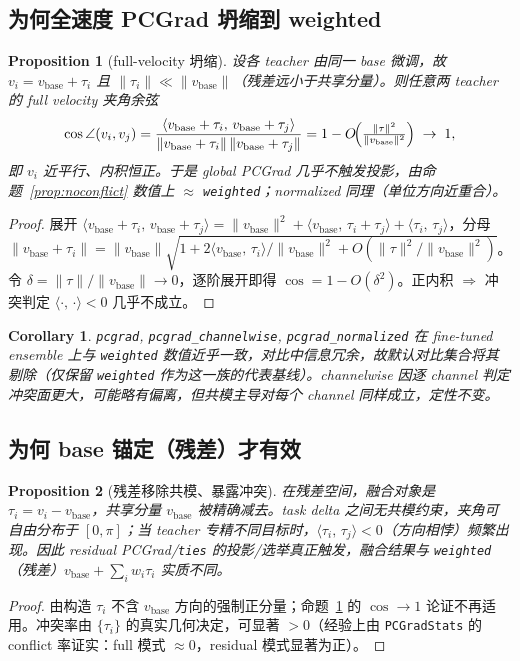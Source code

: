 \documentclass[11pt,a4paper]{article}
\newcommand{\vb}{v_{\mathrm{base}}}
\newcommand{\inner}[2]{\langle #1,\, #2\rangle}
\newcommand{\norm}[1]{\lVert #1\rVert}
\theoremstyle{plain}
\newtheorem{proposition}{Proposition}
\newtheorem{corollary}{Corollary}
\theoremstyle{definition}
\begin{document}
\subsection{为何全速度 PCGrad 坍缩到 weighted}

\begin{proposition}[full-velocity 坍缩]
\label{prop:collapse}
设各 teacher 由同一 base 微调，故 $v_i=\vb+\tau_i$ 且 $\norm{\tau_i}\ll\norm{\vb}$（残差远小于共享分量）。则任意两 teacher 的 full velocity 夹角余弦
\begin{equation}
\cos\angle(v_i,v_j)
=\frac{\inner{\vb+\tau_i}{\vb+\tau_j}}{\norm{\vb+\tau_i}\,\norm{\vb+\tau_j}}
= 1 - O\!\Bigl(\tfrac{\norm{\tau}^2}{\norm{\vb}^2}\Bigr)\;\to\;1,
\label{eq:collapse}
\end{equation}
即 $v_i$ 近平行、内积恒正。于是 global PCGrad 几乎不触发投影，由命题~\ref{prop:noconflict} 数值上 $\approx$ \texttt{weighted}；normalized 同理（单位方向近重合）。
\end{proposition}
\begin{proof}
展开 $\inner{\vb+\tau_i}{\vb+\tau_j}=\norm{\vb}^2+\inner{\vb}{\tau_i+\tau_j}+\inner{\tau_i}{\tau_j}$，分母 $\norm{\vb+\tau_i}=\norm{\vb}\sqrt{1+2\inner{\vb}{\tau_i}/\norm{\vb}^2+O(\norm{\tau}^2/\norm{\vb}^2)}$。令 $\delta=\norm{\tau}/\norm{\vb}\to0$，逐阶展开即得 $\cos=1-O(\delta^2)$。正内积 $\Rightarrow$ 冲突判定 $\inner{\cdot}{\cdot}<0$ 几乎不成立。
\end{proof}

\begin{corollary}
\label{cor:exclude}
\texttt{pcgrad}, \texttt{pcgrad\_channelwise}, \texttt{pcgrad\_normalized} 在 fine-tuned ensemble 上与 \texttt{weighted} 数值近乎一致，对比中信息冗余，故默认对比集合将其剔除（仅保留 \texttt{weighted} 作为这一族的代表基线）。channelwise 因逐 channel 判定冲突面更大，可能略有偏离，但共模主导对每个 channel 同样成立，定性不变。
\end{corollary}

\subsection{为何 base 锚定（残差）才有效}

\begin{proposition}[残差移除共模、暴露冲突]
\label{prop:residual}
在残差空间，融合对象是 $\tau_i=v_i-\vb$，共享分量 $\vb$ 被精确减去。task delta 之间无共模约束，夹角可自由分布于 $[0,\pi]$；当 teacher 专精不同目标时，$\inner{\tau_i}{\tau_j}<0$（方向相悖）频繁出现。因此 residual PCGrad/\texttt{ties} 的投影/选举\emph{真正触发}，融合结果与 \texttt{weighted}（残差）$\vb+\sum_i w_i\tau_i$ 实质不同。
\end{proposition}
\begin{proof}
由构造 $\tau_i$ 不含 $\vb$ 方向的强制正分量；命题~\ref{prop:collapse} 的 $\cos\to1$ 论证不再适用。冲突率由 $\{\tau_i\}$ 的真实几何决定，可显著 $>0$（经验上由 \texttt{PCGradStats} 的 conflict 率证实：full 模式 $\approx0$，residual 模式显著为正）。
\end{proof}
\end{document}
